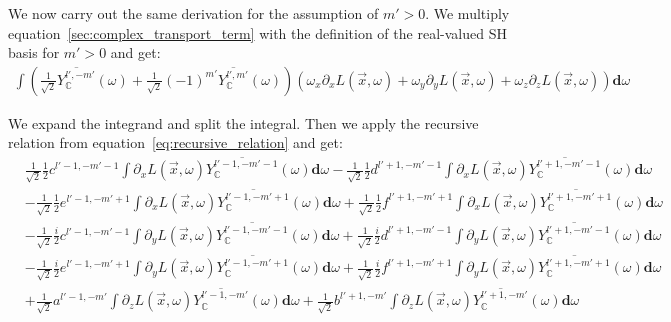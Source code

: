 \documentclass[10pt]{scrartcl}
\begin{document}
We now carry out the same derivation for the assumption of $m'>0$. We multiply equation~\ref{sec:complex_transport_term} with the definition of the real-valued SH basis for $m'>0$ and get:
\begin{align*}
\int{\left(\frac{1}{\sqrt{2}}\overline{Y_{\mathbb{C}}^{l', -m'}}(\omega )+\frac{1}{\sqrt{2}}\left({-1}\right)^{m'}\overline{Y_{\mathbb{C}}^{l', m'}}(\omega )\right)\left(\omega_{x}\partial_xL\left (\vec{x} ,\omega \right )+\omega_{y}\partial_yL\left (\vec{x} ,\omega \right )+\omega_{z}\partial_zL\left (\vec{x} ,\omega \right )\right)\mathbf{d}\omega}
\end{align*}


We expand the integrand and split the integral. Then we apply the recursive relation from equation~\ref{eq:recursive_relation} and get:
\begin{align*}
&
\frac{1}{\sqrt{2}}\frac{1}{2}c^{{l'-1,-m'-1}}\int{\partial_xL\left (\vec{x} ,\omega \right )\overline{Y_{\mathbb{C}}^{l'-1, -m'-1}}(\omega )\mathbf{d}\omega}
-\frac{1}{\sqrt{2}}\frac{1}{2}d^{{l'+1,-m'-1}}\int{\partial_xL\left (\vec{x} ,\omega \right )\overline{Y_{\mathbb{C}}^{l'+1, -m'-1}}(\omega )\mathbf{d}\omega}
\\&
-\frac{1}{\sqrt{2}}\frac{1}{2}e^{{l'-1,-m'+1}}\int{\partial_xL\left (\vec{x} ,\omega \right )\overline{Y_{\mathbb{C}}^{l'-1, -m'+1}}(\omega )\mathbf{d}\omega}
+\frac{1}{\sqrt{2}}\frac{1}{2}f^{{l'+1,-m'+1}}\int{\partial_xL\left (\vec{x} ,\omega \right )\overline{Y_{\mathbb{C}}^{l'+1, -m'+1}}(\omega )\mathbf{d}\omega}
\\&
-\frac{1}{\sqrt{2}}\frac{i}{2}c^{{l'-1,-m'-1}}\int{\partial_yL\left (\vec{x} ,\omega \right )\overline{Y_{\mathbb{C}}^{l'-1, -m'-1}}(\omega )\mathbf{d}\omega}
+\frac{1}{\sqrt{2}}\frac{i}{2}d^{{l'+1,-m'-1}}\int{\partial_yL\left (\vec{x} ,\omega \right )\overline{Y_{\mathbb{C}}^{l'+1, -m'-1}}(\omega )\mathbf{d}\omega}
\\&
-\frac{1}{\sqrt{2}}\frac{i}{2}e^{{l'-1,-m'+1}}\int{\partial_yL\left (\vec{x} ,\omega \right )\overline{Y_{\mathbb{C}}^{l'-1, -m'+1}}(\omega )\mathbf{d}\omega}
+\frac{1}{\sqrt{2}}\frac{i}{2}f^{{l'+1,-m'+1}}\int{\partial_yL\left (\vec{x} ,\omega \right )\overline{Y_{\mathbb{C}}^{l'+1, -m'+1}}(\omega )\mathbf{d}\omega}
\\&
+\frac{1}{\sqrt{2}}a^{{l'-1,-m'}}\int{\partial_zL\left (\vec{x} ,\omega \right )\overline{Y_{\mathbb{C}}^{l'-1, -m'}}(\omega )\mathbf{d}\omega}
+\frac{1}{\sqrt{2}}b^{{l'+1,-m'}}\int{\partial_zL\left (\vec{x} ,\omega \right )\overline{Y_{\mathbb{C}}^{l'+1, -m'}}(\omega )\mathbf{d}\omega}

\end{align*}
\end{document}

